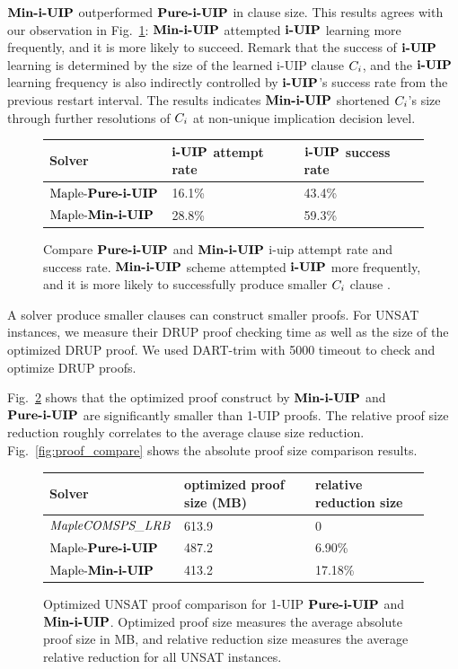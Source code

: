 $\textbf{Min-i-UIP}$ outperformed $\textbf{Pure-i-UIP}$ in clause size.  This results agrees with our observation in Fig.~\ref{fig:t2}: $\textbf{Min-i-UIP}$ attempted $\textbf{i-UIP}$ learning more frequently, and it is more likely to succeed. Remark that the success of $\textbf{i-UIP}$ learning is determined by the size of the learned i-UIP clause $C_{i}$, and the $\textbf{i-UIP}$ learning frequency is also indirectly controlled by $\textbf{i-UIP}$'s success rate from the previous restart interval. The results indicates  $\textbf{Min-i-UIP}$ shortened $C_{i}$'s size through further resolutions of $C_{i}$ at non-unique implication decision level. 

\begin{figure} 
\begin{center} 
\begin{tabular}{ | m{3.5cm} | m{5cm}| m{3.5cm} | } 
\hline
Solver & $\textbf{i-UIP}$ attempt rate & $\textbf{i-UIP}$ success rate  \\ 
\hline
$\text{Maple-\textbf{Pure-i-UIP}}$ & 16.1\% & 43.4\% \\ 
\hline
$\text{Maple-\textbf{Min-i-UIP}}$ & 28.8\% & 59.3\% \\ 
\hline
\end{tabular}
\end{center}
\caption{Compare $\textbf{Pure-i-UIP}$ and $\textbf{Min-i-UIP}$ i-uip attempt rate and success rate. $\textbf{Min-i-UIP}$ scheme attempted $\textbf{i-UIP}$ more frequently, and it is more likely to successfully produce smaller $C_{i}$ clause .}
\label{fig:t2}
\end{figure}

A solver produce smaller clauses can construct smaller proofs. For UNSAT instances, we measure their DRUP\cite{} proof checking time as well as the size of the optimized DRUP proof. We used DART-trim \cite{} with 5000 timeout to check and optimize DRUP proofs. 

Fig.~\ref{fig:t3} shows that the optimized proof construct by $\textbf{Min-i-UIP}$ and $\textbf{Pure-i-UIP}$ are significantly smaller than 1-UIP proofs. The relative proof size reduction roughly correlates to the average clause size reduction. Fig.~\ref{fig:proof_compare} shows the absolute proof size comparison results. 

\begin{figure} 
\begin{center} 
\begin{tabular}{ | m{3.5cm} | m{5cm}| m{3.5cm} | } 
\hline
Solver & optimized proof size (MB) & relative reduction size  \\ 
\hline
$\textit{MapleCOMSPS\_LRB}$ & 613.9 & 0  \\ 
\hline
$\text{Maple-\textbf{Pure-i-UIP}}$ & 487.2 & 6.90\% \\ 
\hline
$\text{Maple-\textbf{Min-i-UIP}}$ & 413.2 & 17.18\% \\ 
\hline
\end{tabular}
\end{center}
\caption{Optimized UNSAT proof comparison for 1-UIP $\textbf{Pure-i-UIP}$ and $\textbf{Min-i-UIP}$. Optimized proof size measures the average absolute proof size in MB, and relative reduction size measures the average relative reduction for all UNSAT instances.}
\label{fig:t3}
\end{figure}

